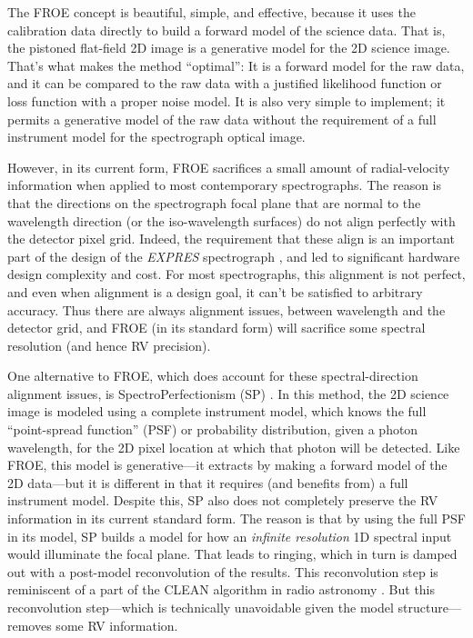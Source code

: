 \documentclass[12pt]{article}
\begin{document}
The FROE concept is beautiful, simple, and effective, because it uses the calibration data directly to build a forward model of the science data.
That is, the pistoned flat-field 2D image is a generative model for the 2D science image.
That's what makes the method ``optimal'': It is a forward model for the raw data, and it can be compared to the raw data with a justified likelihood function or loss function with a proper noise model.
It is also very simple to implement; it permits a generative model of the raw data without the requirement of a full instrument model for the spectrograph optical image.

However, in its current form, FROE sacrifices a small amount of radial-velocity information when applied to most contemporary spectrographs.
The reason is that the directions on the spectrograph focal plane that are normal to the wavelength direction (or the iso-wavelength surfaces) do not align perfectly with the detector pixel grid.
Indeed, the requirement that these align is an important part of the design of the \textsl{EXPRES} spectrograph \cite{expres}, and led to significant hardware design complexity and cost.
For most spectrographs, this alignment is not perfect, and even when alignment is a design goal, it can't be satisfied to arbitrary accuracy.
Thus there are always alignment issues, between wavelength and the detector grid, and FROE (in its standard form) will sacrifice some spectral resolution (and hence RV precision).

One alternative to FROE, which does account for these spectral-direction alignment issues, is SpectroPerfectionism (SP) \cite{sp}.
In this method, the 2D science image is modeled using a complete instrument model, which knows the full ``point-spread function'' (PSF) or probability distribution, given a photon wavelength, for the 2D pixel location at which that photon will be detected.
Like FROE, this model is generative---it extracts by making a forward model of the 2D data---but it is different in that it requires (and benefits from) a full instrument model.
Despite this, SP also does not completely preserve the RV information in its current standard form.
The reason is that by using the full PSF in its model, SP builds a model for how an \emph{infinite resolution} 1D spectral input would illuminate the focal plane.
That leads to ringing, which in turn is damped out with a post-model reconvolution of the results.
This reconvolution step is reminiscent of a part of the CLEAN algorithm in radio astronomy \cite{clean}.
But this reconvolution step---which is technically unavoidable given the model structure---removes some RV information.
\end{document}
